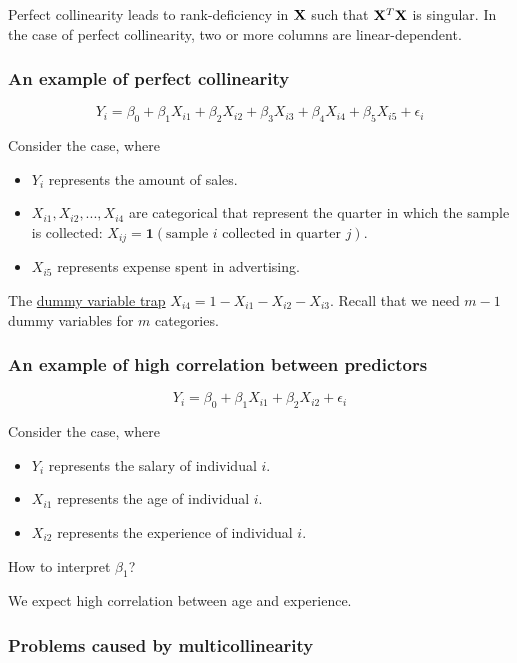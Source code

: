 Perfect collinearity leads to rank-deficiency in $\mathbf{X}$ such that $\mathbf{X} ^T \mathbf{X}$ is singular.
In the case of perfect collinearity, two or more columns are linear-dependent.

\subsubsection*{An example of perfect collinearity}
\begin{equation*}
	Y_i = \beta_0 + \beta_1 X_{i1} + \beta_2 X_{i2} + \beta_3 X_{i3} + \beta_4 X_{i4}  + \beta_5 X_{i5} + \epsilon_i
\end{equation*}

Consider the case, where
\begin{itemize}
	\item $Y_i$ represents the amount of sales.
	\item $X_{i1}, X_{i2}, ..., X_{i4}$ are categorical that represent the quarter in which the sample is collected: $X_{ij} = \mathbf{1}(\mbox{sample } i \mbox{ collected in quarter } j)$.
	\item $X_{i5}$ represents expense spent in advertising.
\end{itemize}

The \underline{dummy variable trap} $X_{i4} = 1 - X_{i1} - X_{i2} - X_{i3}$.  Recall that we need $m-1$ dummy variables for $m$ categories.

\subsubsection*{An example of high correlation between predictors}

\begin{equation*}
	Y_i = \beta_0 + \beta_1 X_{i1} + \beta_2 X_{i2} + \epsilon_i
\end{equation*}

Consider the case, where
\begin{itemize}
	\item $Y_i$ represents the salary of individual $i$.
	\item $X_{i1}$ represents the age of individual $i$.
	\item $X_{i2}$ represents the experience of individual $i$.
\end{itemize}

{How to interpret $\beta_1$?}

We expect high correlation between age and experience.


\subsubsection*{Problems caused by multicollinearity}

